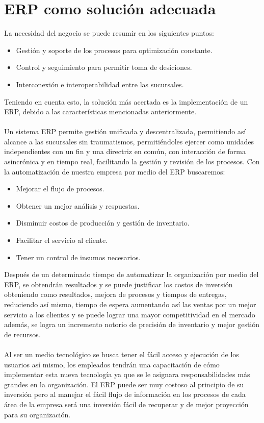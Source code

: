 \section{ERP como soluci\'on adecuada}
%
La necesidad del negocio se puede resumir en los siguientes puntos:%
%
\begin{itemize}
\item Gesti\'on y soporte de los procesos para optimizaci\'on constante.
\item Control y seguimiento para permitir toma de desiciones.
\item Interconexi\'on e interoperabilidad entre las sucursales.
\end{itemize}
%
Teniendo en cuenta esto, la soluci\'on m\'as acertada es la implementaci\'on de un ERP, debido a las caracter\'isticas mencionadas anteriormente.%
\\%
\\%
Un sistema ERP permite gesti\'on unificada y descentralizada, permitiendo as\'i alcance a las sucursales sin traumatismos, permiti\'endoles ejercer como unidades independientes con un fin y una directriz en com\'un, con interacci\'on de forma asincr\'onica y en tiempo real, facilitando la gesti\'on y revisi\'on de los procesos.%
Con la automatizaci\'on de nuestra empresa por medio del ERP buscaremos:
%
\begin{itemize}
	\item Mejorar el flujo de procesos. 
	\item Obtener un mejor an\'alisis y respuestas.
	\item Disminuir costos de producci\'on y gesti\'on de inventario.
	\item Facilitar el servicio al cliente.
	\item Tener un control de insumos necesarios.
\end{itemize}
%
Despu\'es de un determinado tiempo de automatizar la organizaci\'on por medio del ERP, se obtendr\'an resultados y se puede justificar los costos de inversi\'on obteniendo como resultados, mejora de procesos y tiempos de entregas, reduciendo as\'i mismo, tiempo de espera  aumentando as\'i las ventas por un mejor servicio a los clientes y se puede lograr una mayor competitividad  en el mercado adem\'as, se logra un incremento notorio de precisi\'on de inventario y mejor gesti\'on de recursos.%
\\%
\\%
Al ser un medio tecnol\'ogico se busca tener el f\'acil acceso y ejecuci\'on de los usuarios as\'i mismo, los empleados tendr\'an una capacitaci\'on de c\'omo implementar esta nueva tecnolog\'ia ya que se le asignara responsabilidades m\'as grandes en la organizaci\'on. El ERP puede ser muy costoso al principio de su inversi\'on pero al manejar el f\'acil flujo de informaci\'on en los procesos de cada \'area de la empresa ser\'a una inversi\'on f\'acil de recuperar y de mejor proyecci\'on para su organizaci\'on.%
